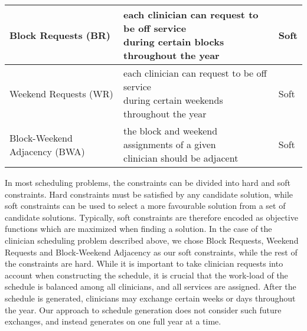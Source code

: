 \begin{table}[h]
\begin{tabular}{ l l l }
		Block Requests (BR)         & \makecell[l]{each clinician can request to be
			off service \\ during certain blocks throughout the year}                       
		& Soft          \\ \hline
		Weekend Requests (WR)        & \makecell[l]{each clinician can request to be
			off service \\ during certain weekends throughout the year}                     
		& Soft          \\ \hline
		Block-Weekend Adjacency (BWA)  & \makecell[l]{the block and weekend
			assignments of a given \\ clinician should be adjacent}                         
		& Soft
    \\\bottomrule %
	\end{tabular}
\end{table}

In most scheduling problems, the constraints can be divided into hard and soft
constraints. Hard constraints must be satisfied by any candidate solution, while
soft constraints can be used to select a more favourable solution from a set of
candidate solutions. Typically, soft constraints are therefore encoded as objective
functions which are
maximized when finding a solution. In the case of the clinician
scheduling problem described above, we chose Block Requests, Weekend Requests and Block-Weekend
Adjacency as our soft constraints, while the rest of the constraints are hard.
While it is important to take clinician requests into account when constructing
the schedule, it is crucial that the work-load of the schedule is balanced among
all clinicians, and all services are assigned.
After the schedule is generated, clinicians may
exchange certain weeks or days throughout the year.
Our approach to schedule generation does not
consider such future exchanges, and instead generates on one full year at a time.
